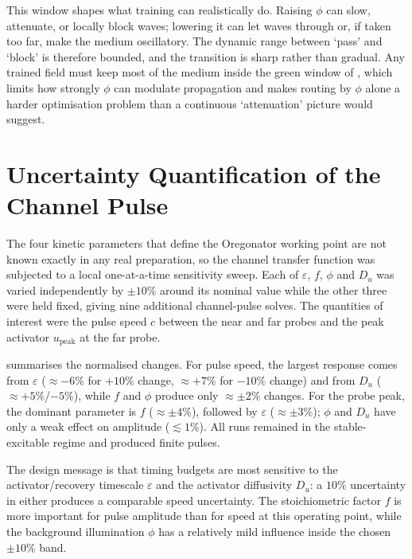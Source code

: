 This window shapes what training can realistically do.
Raising $\phi$ can slow, attenuate, or locally block waves; lowering it can let waves through or, if taken too far, make the medium oscillatory.
The dynamic range between `pass' and `block' is therefore bounded, and the transition is sharp rather than gradual.
Any trained field must keep most of the medium inside the green window of , which limits how strongly $\phi$ can modulate propagation and makes routing by $\phi$ alone a harder optimisation problem than a continuous `attenuation' picture would suggest.

\section{Uncertainty Quantification of the Channel Pulse}
\label{sec:res_uq}

The four kinetic parameters that define the Oregonator working point are not known exactly in any real preparation, so the channel transfer function was subjected to a local one-at-a-time sensitivity sweep.
Each of $\varepsilon$, $f$, $\phi$ and $D_{u}$ was varied independently by $\pm 10\%$ around its nominal value while the other three were held fixed, giving nine additional channel-pulse solves.
The quantities of interest were the pulse speed $c$ between the near and far probes and the peak activator $u_{\mathrm{peak}}$ at the far probe.

 summarises the normalised changes.
For pulse speed, the largest response comes from $\varepsilon$ ($\approx -6\%$ for $+10\%$ change, $\approx +7\%$ for $-10\%$ change) and from $D_{u}$ ($\approx +5\%$/$-5\%$), while $f$ and $\phi$ produce only $\approx \pm 2\%$ changes.
For the probe peak, the dominant parameter is $f$ ($\approx \pm 4\%$), followed by $\varepsilon$ ($\approx \pm 3\%$); $\phi$ and $D_{u}$ have only a weak effect on amplitude ($\lesssim 1\%$).
All runs remained in the stable-excitable regime and produced finite pulses.

The design message is that timing budgets are most sensitive to the activator/recovery timescale $\varepsilon$ and the activator diffusivity $D_{u}$: a $10\%$ uncertainty in either produces a comparable speed uncertainty.
The stoichiometric factor $f$ is more important for pulse amplitude than for speed at this operating point, while the background illumination $\phi$ has a relatively mild influence inside the chosen $\pm 10\%$ band.

